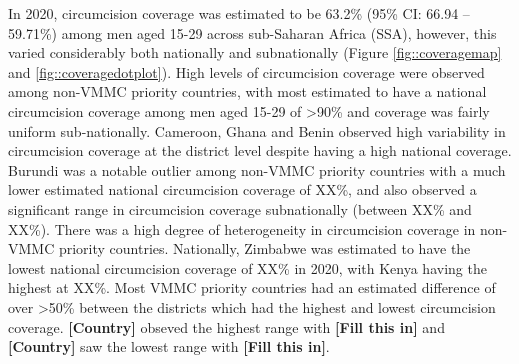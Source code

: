 \documentclass{article}
\begin{document}

%

In 2020, circumcision coverage was estimated to be 63.2\% (95\% CI: 66.94 -- 59.71\%) among men aged 15-29 across sub-Saharan Africa (SSA), however, this varied considerably both nationally and subnationally (Figure \ref{fig::coveragemap} and \ref{fig::coveragedotplot}). High levels of circumcision coverage were observed among non-VMMC priority countries, with most estimated to have a national circumcision coverage among men aged 15-29 of >90\% and coverage was fairly uniform sub-nationally. Cameroon, Ghana and Benin observed high variability in circumcision coverage at the district level despite having a high national coverage. Burundi was a notable outlier among non-VMMC priority countries with a much lower estimated national circumcision coverage of XX\%, and also observed a significant range in circumcision coverage subnationally (between XX\% and XX\%). There was a high degree of heterogeneity in circumcision coverage in non-VMMC priority countries. Nationally, Zimbabwe was estimated to have the lowest national circumcision coverage of XX\% in 2020, with Kenya having the highest at XX\%. Most VMMC priority countries had an estimated difference of over >50\% between the districts which had the highest and lowest circumcision coverage. {\bf\color{red}[Country]} obseved the highest range with {\bf\color{red}[Fill this in]} and {\bf\color{red}[Country]} saw the lowest range with {\bf\color{red}[Fill this in]}. 
\end{document}
